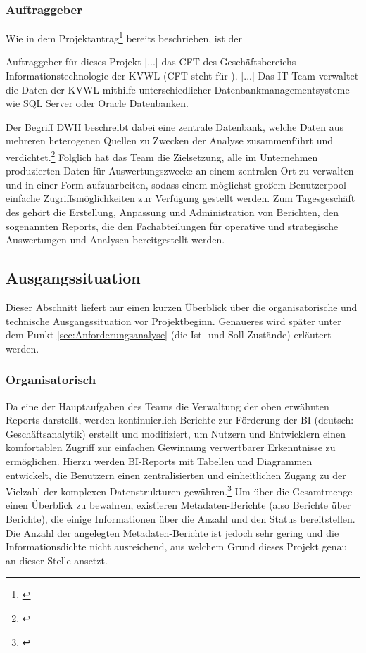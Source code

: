 \subsubsection{Auftraggeber} 
\label{sec:Auftraggeber}
Wie in dem Projektantrag\footnote{\cite{Projektantrag}} bereits beschrieben, ist der
\begin{displayquote}
	Auftraggeber für dieses Projekt [...] das \acs{CFT} \teamName des Geschäftsbereichs Informationstechnologie der \ac{KVWL} (\acs{CFT} steht für ).
	[...]
	Das IT-Team \teamName verwaltet die Daten der \ac{KVWL} mithilfe unterschiedlicher Datenbankmanagementsysteme wie SQL Server oder Oracle Datenbanken.
\end{displayquote}
Der Begriff \ac{DWH} beschreibt dabei eine zentrale Datenbank, welche Daten aus mehreren heterogenen Quellen zu Zwecken der Analyse zusammenführt und verdichtet.\footnote{\Vgl \cite{wiki:dwh}}
Folglich hat das Team die Zielsetzung, alle im Unternehmen produzierten Daten für Auswertungszwecke an einem zentralen Ort zu verwalten und in einer Form aufzuarbeiten, sodass einem möglichst großem Benutzerpool einfache Zugriffsmöglichkeiten zur Verfügung gestellt werden.
Zum Tagesgeschäft des \teamName gehört die Erstellung, Anpassung und Administration von Berichten, den sogenannten Reports, die den Fachabteilungen für operative und strategische Auswertungen und Analysen bereitgestellt werden.

\subsection{Ausgangssituation} 
\label{sec:Ausgangssituation}
Dieser Abschnitt liefert nur einen kurzen Überblick über die organisatorische und technische Ausgangssituation vor Projektbeginn. Genaueres wird später unter dem Punkt \ref{sec:Anforderungsanalyse} (\ua die Ist- und Soll-Zustände) erläutert werden.

\subsubsection{Organisatorisch}
\label{sec:Ausgangssituation:Organisatorisch}
Da eine der Hauptaufgaben des Teams die Verwaltung der oben erwähnten Reports darstellt, werden kontinuierlich Berichte zur Förderung der \ac{BI} (deutsch: Geschäftsanalytik) erstellt und modifiziert, um Nutzern und Entwicklern einen komfortablen Zugriff zur einfachen Gewinnung verwertbarer Erkenntnisse zu ermöglichen. Hierzu werden \ac{BI}-Reports mit Tabellen und Diagrammen entwickelt, die Benutzern einen zentralisierten und einheitlichen Zugang zu der Vielzahl der komplexen Datenstrukturen gewähren.\footnote{\Vgl \cite{Projektantrag}}
Um über die Gesamtmenge einen Überblick zu bewahren, existieren Metadaten-Berichte (also Berichte über Berichte), die einige Informationen \zB über die Anzahl und den Status bereitstellen.
Die Anzahl der angelegten Metadaten-Berichte ist jedoch sehr gering und die Informationsdichte nicht ausreichend, aus welchem Grund dieses Projekt genau an dieser Stelle ansetzt.

